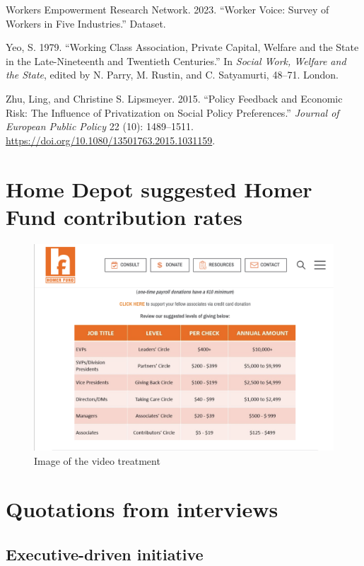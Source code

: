 \documentclass[
  11pt,
  oneside]{article}
\newlength{\cslhangindent}
\newenvironment{CSLReferences}[2] %
 {\begin{list}{}{%
  \setlength{\itemindent}{0pt}
  \setlength{\leftmargin}{0pt}
  \setlength{\parsep}{0pt}
  \ifodd #1
   \setlength{\leftmargin}{\cslhangindent}
   \setlength{\itemindent}{-1\cslhangindent}
  \fi
  \setlength{\itemsep}{#2\baselineskip}}}
 {\end{list}}
\begin{document}
\begin{CSLReferences}{1}{0}
Workers Empowerment Research Network. 2023. {``Worker Voice: Survey of Workers in Five Industries.''} Dataset.

Yeo, S. 1979. {``Working Class Association, Private Capital, Welfare and the State in the Late-Nineteenth and Twentieth Centuries.''} In \emph{Social Work, Welfare and the State}, edited by N. Parry, M. Rustin, and C. Satyamurti, 48--71. London.

Zhu, Ling, and Christine S. Lipsmeyer. 2015. {``Policy Feedback and Economic Risk: The Influence of Privatization on Social Policy Preferences.''} \emph{Journal of European Public Policy} 22 (10): 1489--1511. \url{https://doi.org/10.1080/13501763.2015.1031159}.

\end{CSLReferences}

\newpage

\appendix


\section{Home Depot suggested Homer Fund contribution rates}\label{home-depot-suggested-homer-fund-contribution-rates}

\begin{figure}
\includegraphics[width=0.6\linewidth]{plots/HF_donation_suggestions} \caption{Image of the video treatment}\label{fig:fig-sugdon}
\end{figure}

\section{Quotations from interviews}\label{app-interviews}

\subsection{Executive-driven initiative}\label{executive-driven-initiative}
\end{document}
